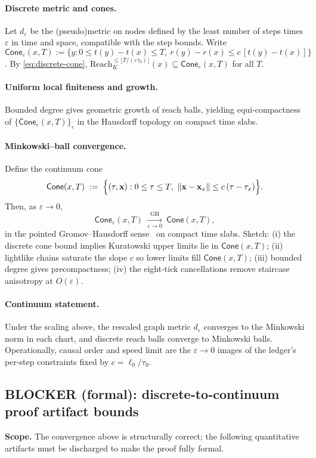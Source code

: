 \documentclass[12pt,a4paper]{article}
\theoremstyle{definition}
\theoremstyle{remark}
\begin{document}
\paragraph{Discrete metric and cones.}
Let \(d_\varepsilon\) be the (pseudo)metric on nodes defined by the least number of steps times \(\varepsilon\) in time and space, compatible with the step bounds. Write \(\mathsf{Cone}_\varepsilon(x,T):=\{y: 0\le t(y)-t(x)\le T,\ r(y)-r(x)\le c\,[t(y)-t(x)]\}\). By \eqref{eq:discrete-cone}, \(\mathrm{Reach}_K^{\le \lfloor T/(\varepsilon\tau_0)\rfloor}(x)\subseteq \mathsf{Cone}_\varepsilon(x,T)\) for all \(T\).

\paragraph{Uniform local finiteness and growth.}
Bounded degree gives geometric growth of reach balls, yielding equi‑compactness of \(\{\mathsf{Cone}_\varepsilon(x,T)\}_\varepsilon\) in the Hausdorff topology on compact time slabs.

\paragraph{Minkowski–ball convergence.}
Define the continuum cone
\[
\mathsf{Cone}(x,T)\;:=\;\Bigl\{(\tau,\mathbf{x}) : 0\le \tau\le T,\ \|\mathbf{x}-\mathbf{x}_x\|\le c\,(\tau-\tau_x)\Bigr\}.
\]
Then, as \(\varepsilon\to 0\),
\[
\mathsf{Cone}_\varepsilon(x,T)\ \xrightarrow[\varepsilon\to 0]{\ \ \mathrm{GH}\ \ }\ \mathsf{Cone}(x,T),
\]
in the pointed Gromov–Hausdorff sense~\cite{Gromov1999,BuragoBuragoIvanov2001} on compact time slabs. Sketch: (i) the discrete cone bound implies Kuratowski upper limits lie in \(\mathsf{Cone}(x,T)\); (ii) lightlike chains saturate the slope \(c\) so lower limits fill \(\mathsf{Cone}(x,T)\); (iii) bounded degree gives precompactness; (iv) the eight‑tick cancellations remove staircase anisotropy at \(O(\varepsilon)\).

\paragraph{Continuum statement.}
Under the scaling above, the rescaled graph metric \(d_\varepsilon\) converges to the Minkowski norm in each chart, and discrete reach balls converge to Minkowski balls. Operationally, causal order and speed limit are the \(\varepsilon\to 0\) images of the ledger's per‑step constraints fixed by \(c=\ell_0/\tau_0\).

\subsection{BLOCKER (formal): discrete‑to‑continuum proof artifact bounds}
\noindent\textbf{Scope.} The convergence above is structurally correct; the following quantitative artifacts must be discharged to make the proof fully formal.
\end{document}
